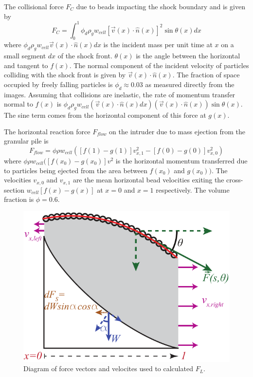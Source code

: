 The collisional force $F_{C}$ due to beads impacting the shock boundary and is given by 
\begin{equation} 
F_{C} = \int_0^1 \phi_{d}\rho_{g}w_{cell} [\vec{v}(x)\cdot \hat{n}(x)]^{2} \sin{\theta(x)}dx
\label{fcollision}
\end{equation}
where $\phi_{d}\rho_{g}w_{cell} \vec{v}(x)\cdot \hat{n}(x)dx$ is the incident mass per unit time at $x$ on a small segment $dx$ of the shock front. $\theta(x)$ is the angle between the horizontal and tangent to $f(x)$.  The normal component of the incident velocity of particles colliding with the shock front is given by $\vec{v}(x)\cdot \hat{n}(x)$. The fraction of space occupied by freely falling particles is $\phi_{d}\approx0.03$ as measured directly from the images. Assuming that collisions are inelastic, the rate of momentum transfer normal to $f(x)$ is $\phi_{d}\rho_{g}w_{cell} \left(\vec{v}(x)\cdot \hat{n}(x)dx \right) \left(\vec{v}(x)\cdot \hat{n}(x)\right)\sin\theta(x)$. The sine term comes from the horizontal component of this force at $g(x)$.

The horizontal reaction force $F_{flow}$ on the intruder due to mass ejection from the granular pile  is 
\begin{equation} 
F_{flow} =  \phi \rho w_{cell} \left( \left[ f(1)-g(1) \right] v_{x,1}^{2} - \left[ f(0)-g(0) \right] v_{x,0}^{2} \right)
\label{fflow}
\end{equation}
where $\phi \rho w_{cell}([f(x_0)-g(x_0)] v^{2}$ is the horizontal momentum transferred due to particles being ejected from the area between $f(x_0)$ and $g(x_0))$. The velocities $v_{x,0}$ and $v_{x,1}$ are the mean horizontal bead velocities exiting the cross-section $w_{cell}[f(x)-g(x)]$ at $x=0$ and $x=1$ respectively. The volume fraction is $\phi=0.6$. 


\begin{figure}
	\includegraphics[width=\textwidth]{Figures/chapter3sup/diagramSupplement}
	\caption{Diagram of force vectors and velocites used to calculated $F_{L}$.}
	\label{diagram}
\end{figure}

